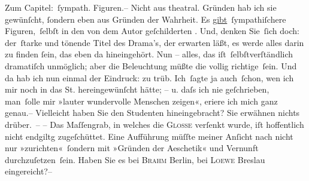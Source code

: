 \pstart
           Zum Capitel: ſympath. Figuren.– Nicht aus theatral. Gründen hab ich sie gewünſcht,{ }ſondern eben aus Gründen der Wahrheit. Es \uline{gibt} ſympathiſchere Figuren, ſelbſt in den von dem Autor geſchilderten \label{K_L03913-1v}\label{K_L03913-1}. Und, denken Sie ſich doch: der ſtarke und tönende {\pb}Titel des Drama’s, der erwarten läßt, es werde alles darin zu finden{ }ſein, das eben da
               hineingehört. Nun – alles, das iſt ſelbſtverſtändlich dramatiſch unmöglich; aber die
               Beleuchtung müßte die vollig richtige ſein. Und da hab ich nun einmal der Eindruck:
               zu trüb. Ich ſagte ja auch ſchon, wen ich mir noch in das St. hereingewünſcht hätte; – u. daſs ich nie geſchrieben,
               man ſolle mir »lauter wundervolle Menschen zeigen«, eri{\geminationn}ere ich mich ganz genau.–
               Vielleicht haben Sie den Studenten hineingebracht? Sie erwähnen nichts drüber. –
               – Das Maſſengrab, in welches die \textsc{Glosse}{ }{\pb}verſenkt wurde, iſt hoffentlich nicht endgiltg
               zugeſchüttet. Eine Aufführung müſſte meiner Anſicht nach nicht nur
               »zurichten« ſondern mit »Gründen der Aeschetik« und Vernunft durchzuſetzen ſein.
               Haben Sie es bei \textsc{Brahm}{ }Berlin, bei \textsc{Loewe}{ }Breslau eingereicht?–\pend
           
